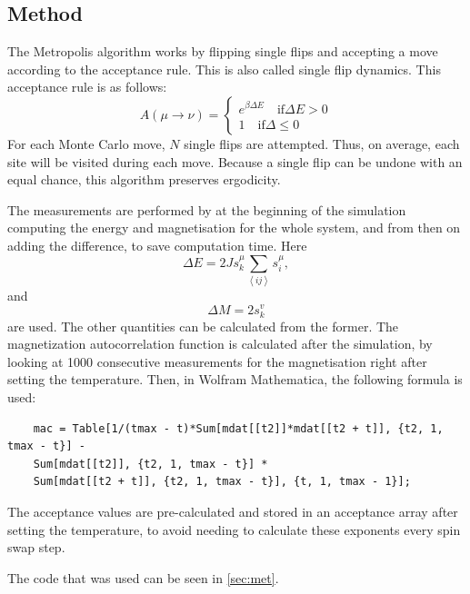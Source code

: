 \documentclass[a4paper]{article}
\begin{document}
\subsection{Method}
The Metropolis algorithm works by flipping single flips and accepting a move according to the acceptance rule. This is also called single flip dynamics. 
This acceptance rule is as follows:
\begin{equation}
A(\mu \rightarrow\nu) = \begin{cases}
e^{\beta \Delta E} \quad \text{if} \Delta E>0 \\
1 \quad \text{if} \Delta \leq 0
\end{cases}
\end{equation}
For each Monte Carlo move, $N$ single flips are attempted. Thus, on average, each site will be visited during each move. Because a single flip can be undone with an equal chance, this algorithm preserves ergodicity.

The measurements are performed by at the beginning of the simulation computing the energy and magnetisation for the whole system, and from then on adding the difference, to save computation time. Here 
\begin{equation}
\Delta E = 2J s_k^{\mu} \sum_{\left<ij\right>} s_i^{\mu},
\end{equation}
and
\begin{equation}
\Delta M = 2 s_k^{v}
\end{equation}
are used.
The other quantities can be calculated from the former. The magnetization autocorrelation function is calculated after the simulation, by looking at 1000 consecutive measurements for the magnetisation right after setting the temperature. Then, in Wolfram Mathematica, the following formula is used:
\begin{lstlisting}
	mac = Table[1/(tmax - t)*Sum[mdat[[t2]]*mdat[[t2 + t]], {t2, 1, tmax - t}] - 
	Sum[mdat[[t2]], {t2, 1, tmax - t}] *
	Sum[mdat[[t2 + t]], {t2, 1, tmax - t}], {t, 1, tmax - 1}];
\end{lstlisting}

The acceptance values are pre-calculated and stored in an acceptance array after setting the temperature, to avoid needing to calculate these exponents every spin swap step.

The code that was used can be seen in \autoref{sec:met}.
\end{document}
